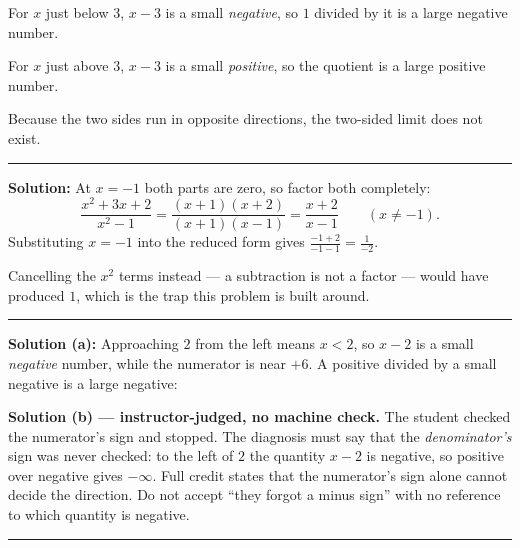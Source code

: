 \documentclass[12pt]{article}
\begin{document}
For $x$ just below $3$, $x - 3$ is a small \emph{negative}, so $1$ divided by it
is a large negative number. \ans{-\infty}

For $x$ just above $3$, $x - 3$ is a small \emph{positive}, so the quotient is a
large positive number. \ans{+\infty}

Because the two sides run in opposite directions, the two-sided limit does not
exist.

\vspace{0.2cm}\noindent\rule{\linewidth}{0.2pt}\vspace{0.2cm}


\textbf{Solution:} At $x = -1$ both parts are zero, so factor both completely:
\[
  \frac{x^2+3x+2}{x^2-1} = \frac{(x+1)(x+2)}{(x+1)(x-1)} = \frac{x+2}{x-1}
  \qquad (x \neq -1).
\]
Substituting $x = -1$ into the reduced form gives
$\frac{-1+2}{-1-1} = \frac{1}{-2}$. 

Cancelling the $x^2$ terms instead --- a subtraction is not a factor --- would
have produced $1$, which is the trap this problem is built around.

\vspace{0.2cm}\noindent\rule{\linewidth}{0.2pt}\vspace{0.2cm}


\textbf{Solution (a):} Approaching $2$ from the left means $x < 2$, so $x - 2$ is
a small \emph{negative} number, while the numerator is near $+6$. A positive
divided by a small negative is a large negative:
\ans{-\infty}

\textbf{Solution (b) --- instructor-judged, no machine check.} The student
checked the numerator's sign and stopped. The diagnosis must say that the
\emph{denominator's} sign was never checked: to the left of $2$ the quantity
$x - 2$ is negative, so positive over negative gives $-\infty$. Full credit
states that the numerator's sign alone cannot decide the direction. Do not
accept ``they forgot a minus sign'' with no reference to which quantity is
negative.

\vspace{0.2cm}\noindent\rule{\linewidth}{0.2pt}\vspace{0.2cm}

\end{document}
